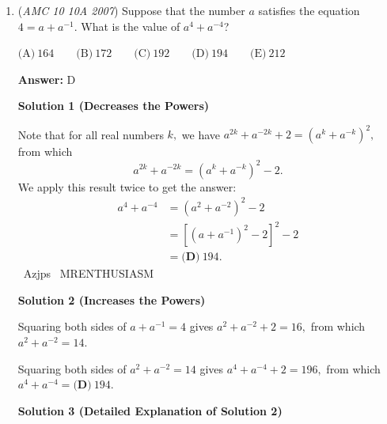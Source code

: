 \begin{enumerate}
 $2\sqrt2n-2n^2=\frac{1}{2}\rightarrow-2n^2+2\sqrt2n-\frac{1}{2}=0$.

 

 By the \href{https://artofproblemsolving.com/wiki/index.php?title=Quadratic\_formula}{quadratic formula}, 

 $n=\frac{-2\sqrt{2}\pm\sqrt{(2\sqrt{2})^2-4(-2)(-\frac{1}{2})}}{2(-2)}\rightarrow n=\frac{-2\sqrt{2}\pm 2}{-4}\rightarrow n=\frac{\sqrt{2}\pm 1}{2}$
$\frac{\sqrt{2}+1}{2}$ is greater than the length of the square, so it is impossible for that to be the brush width. Thus $n=\frac{\sqrt{2}-1}{2}$. We want to find $\frac{1}{n}$, and $\frac{1}{n}=\frac{2}{\sqrt{2}-1}$. Multiply the numerator and the denominator by $\sqrt{2}+1$, 

 $\frac{1}{n}=\frac{2(\sqrt{2}+1)}{(\sqrt{2}-1)(\sqrt{2}+1)}=\boxed{2\sqrt{2}+2}\rightarrow C$



	\item (\textit{AMC 10 10A 2007}) Suppose that the number $a$ satisfies the equation $4 = a + a^{ - 1}$. What is the value of $a^{4} + a^{ - 4}$?


 $\text{(A)}\ 164 \qquad \text{(B)}\ 172 \qquad \text{(C)}\ 192 \qquad \text{(D)}\ 194 \qquad \text{(E)}\ 212$

 \textbf{Answer: }D



\textbf{Solution 1 (Decreases the Powers)}

Note that for all real numbers $k,$ we have $a^{2k} + a^{-2k} + 2 = (a^{k} + a^{-k})^2,$ from which 
 \[a^{2k} + a^{-2k} = (a^{k} + a^{-k})^2-2.\] We apply this result twice to get the answer:
 \begin{align*} a^4 + a^{-4} &= (a^2 + a^{-2})^2 - 2 \\ &= [(a + a^{-1})^2 - 2]^2 - 2 \\ &= \boxed{\textbf{(D)}\ 194}. \end{align*}
~Azjps ~MRENTHUSIASM

 



\textbf{Solution 2 (Increases the Powers)}

Squaring both sides of $a+a^{-1}=4$ gives $a^2+a^{-2}+2=16,$ from which $a^2+a^{-2}=14.$

 Squaring both sides of $a^2+a^{-2}=14$ gives $a^4+a^{-4}+2=196,$ from which $a^4+a^{-4}=\boxed{\textbf{(D)}\ 194}.$




\textbf{Solution 3 (Detailed Explanation of Solution 2)}


\end{enumerate}
